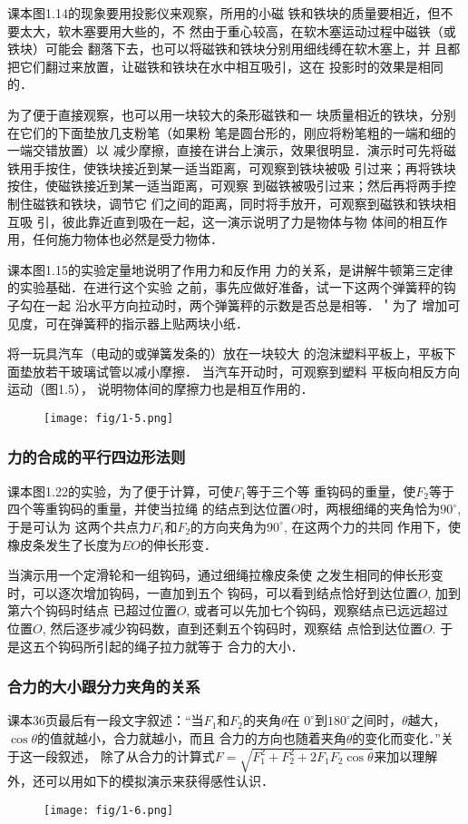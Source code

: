 课本图1.14的现象要用投影仪来观察，所用的小磁
铁和铁块的质量要相近，但不要太大，软木塞要用大些的，不
然由于重心较高，在软木塞运动过程中磁铁（或铁块）可能会
翻落下去，也可以将磁铁和铁块分别用细线缚在软木塞上，并
且都把它们翻过来放置，让磁铁和铁块在水中相互吸引，这在
投影时的效果是相同的．

为了便于直接观察，也可以用一块较大的条形磁铁和一
块质量相近的铁块，分别在它们的下面垫放几支粉笔（如果粉
笔是圆台形的，刚应将粉笔粗的一端和细的一端交错放置）以
减少摩擦，直接在讲台上演示，效果很明显．演示时可先将磁
铁用手按住，使铁块接近到某一适当距离，可观察到铁块被吸
引过来；再将铁块按住，使磁铁接近到某一适当距离，可观察
到磁铁被吸引过来；然后再将两手控制住磁铁和铁块，调节它
们之间的距离，同时将手放开，可观察到磁铁和铁块相互吸
引，彼此靠近直到吸在一起，这一演示说明了力是物体与物
体间的相互作用，任何施力物体也必然是受力物体．

课本图1.15的实验定量地说明了作用力和反作用
力的关系，是讲解牛顿第三定律的实验基础．在进行这个实验
之前，事先应做好准备，试一下这两个弹簧秤的钩子勾在一起
沿水平方向拉动时，两个弹簧秤的示数是否总是相等．＇为了
增加可见度，可在弹簧秤的指示器上贴两块小纸．

将一玩具汽车（电动的或弹簧发条的）放在一块较大
的泡沫塑料平板上，平板下面垫放若干玻璃试管以减小摩擦．
当汽车开动时，可观察到塑料
平板向相反方向运动（图1.5），
说明物体间的摩擦力也是相互作用的．
\begin{figure}[htp]
    \centering
    \texttt{[image: fig/1-5.png]}
    \caption{}
\end{figure}

\subsubsection{力的合成的平行四边形法则}
课本图1.22的实验，为了便于计算，可使$F_1$等于三个等
重钩码的重量，使$F_2$等于四个等重钩码的重量，并使当拉绳
的结点到达位置$O$时，两根细绳的夹角恰为$90^{\circ}$, 于是可认为
这两个共点力$F_1$和$F_2$的方向夹角为$90^{\circ}$, 在这两个力的共同
作用下，使橡皮条发生了长度为$EO$的伸长形变．

当演示用一个定滑轮和一组钩码，通过细绳拉橡皮条使
之发生相同的伸长形变时，可以逐次增加钩码，一直加到五个
钩码，可以看到结点恰好到达位置$O$, 加到第六个钩码时结点
已超过位置$O$, 或者可以先加七个钩码，观察结点已远远超过
位置$O$, 然后逐步减少钩码数，直到还剩五个钩码时，观察结
点恰到达位置$O$. 于是这五个钩码所引起的绳子拉力就等于
合力的大小．

\subsubsection{合力的大小跟分力夹角的关系}
课本36页最后有一段文字叙述：“当$F_1$和$F_2$的夹角$\theta$在
$0^{\circ}$到$180^{\circ}$之间时，$\theta$越大，$\cos\theta$的值就越小，合力就越小，而且
合力的方向也随着夹角$\theta$的变化而变化．”关于这一段叙述，
除了从合力的计算式$F=\sqrt{F^2_1+F^2_2+2F_1F_2\cos\theta}$来加以理解
外，还可以用如下的模拟演示来获得感性认识．
\begin{figure}[htp]
    \centering
    \texttt{[image: fig/1-6.png]}
    \caption{}
\end{figure}


